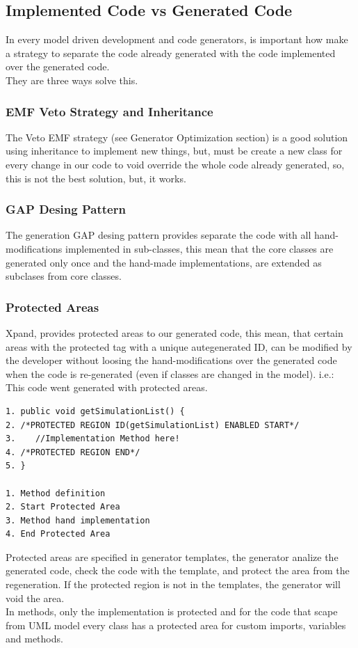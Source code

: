 \subsection{Implemented Code vs Generated Code}
In every model driven development and code generators, is important how make a
strategy to separate the code already generated with the code implemented over
the generated code.\\
They are three ways solve this.

\subsubsection{EMF Veto Strategy and Inheritance}
The Veto EMF strategy (see Generator Optimization section) is a good solution
using inheritance to implement new things, but, must be create a new class for every change in our code to void
override the whole code already generated, so, this is not the best solution,
but, it works.

\subsubsection{GAP Desing Pattern}
The generation GAP desing pattern provides separate the code with all
hand-modifications implemented in sub-classes, this mean that the core classes
are generated only once and the hand-made implementations, are extended as
subclases from core classes.

\subsubsection{Protected Areas}
Xpand, provides protected areas to our generated code, this mean, that certain
areas with the protected tag with a unique autegenerated ID, can be modified by
the developer without loosing the hand-modifications over the generated code
when the code is re-generated (even if classes are changed in the model).
i.e.: This code went generated with protected areas.
\begin{verbatim}
1. public void getSimulationList() {
2. /*PROTECTED REGION ID(getSimulationList) ENABLED START*/
3.    //Implementation Method here!
4. /*PROTECTED REGION END*/
5. }

1. Method definition
2. Start Protected Area
3. Method hand implementation
4. End Protected Area
\end{verbatim}
Protected areas are specified in generator templates, the generator analize the
generated code, check the code with the template, and protect the area from the
regeneration. If the protected region is not in the templates, the generator
will void the area.\\
In methods, only the implementation is protected and for the code that scape
from UML model every class has a protected area for custom imports, variables and methods.
